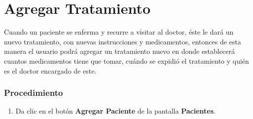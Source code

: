 \section{Agregar Tratamiento}

Cuando un paciente se enferma y recurre a visitar al doctor, éste le dará un nuevo tratamiento, con nuevas instrucciones y medicamentos, entonces de esta manera el usuario podrá agregar un tratamiento nuevo en donde establecerá cuantos medicamentos tiene que tomar, cuándo se expidió el tratamiento y quién es el doctor encargado de este.

\subsubsection{Procedimiento}
\begin{enumerate}
	
	\item Da clic en el botón \textbf{Agregar Paciente} de la pantalla \textbf{Pacientes}.
	

\end{enumerate}
